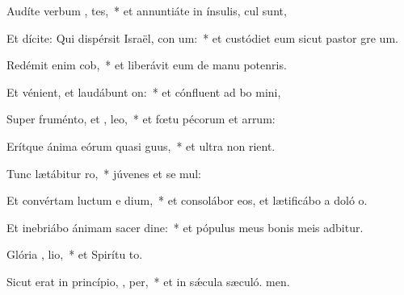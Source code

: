 \item Audíte verbum , tes,~* et annuntiáte in ínsulis,  cul sunt,
\item Et dícite: Qui dispérsit Israël, con um:~* et custódiet eum sicut pastor gre um.
\item Redémit enim  cob,~* et liberávit eum de manu potenris.
\item Et vénient, et laudábunt   on:~* et cónfluent ad bo mini,
\item Super fruménto, et ,  leo,~* et fœtu pécorum et arrum:
\item Erítque ánima eórum quasi  guus,~* et ultra non rient.
\item Tunc lætábitur   ro,~* júvenes et se mul:
\item Et convértam luctum e  dium,~* et consolábor eos, et lætificábo a doló o.
\item Et inebriábo ánimam sacer dine:~* et pópulus meus bonis meis adbitur.
\item Glória ,  lio,~* et Spirítu to.
\item Sicut erat in princípio,  ,  per,~* et in sǽcula sæculó. men.

